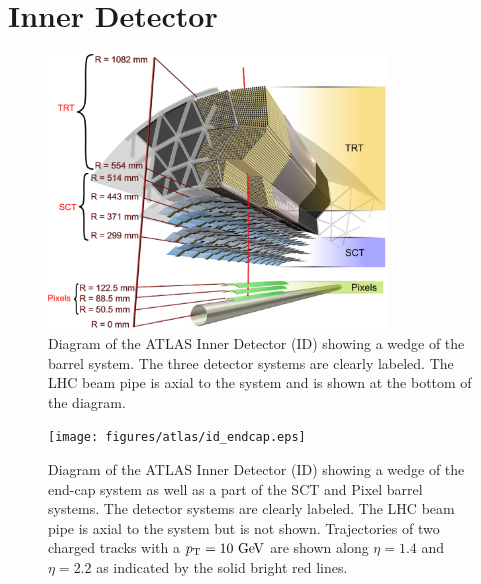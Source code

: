 \section{Inner Detector}
\label{sec:atlas_id}

\begin{figure}[htb]
\centering
\includegraphics[width=0.8\textwidth]{figures/atlas/id_barrel.eps}
\caption{Diagram of the ATLAS Inner Detector (ID) showing 
a wedge of the barrel system.  The three detector systems
are clearly labeled. The LHC beam pipe is axial to the system
and is shown at the bottom of the diagram.}
\label{fig:atlas_id_barrel}
\end{figure}

\begin{figure}[htb]
\centering
\texttt{[image: figures/atlas/id\_endcap.eps]}
\caption{Diagram of the ATLAS Inner Detector (ID) showing 
a wedge of the end-cap system as well as a part of the SCT and Pixel
barrel systems.  The detector systems
are clearly labeled.  The LHC beam pipe is axial to the system
but is not shown. Trajectories of two charged tracks 
with a $\pt=10\GeV$ are shown along $\eta=1.4$ and $\eta=2.2$ as
indicated by the solid bright red lines.}
\label{fig:atlas_id_endcap}
\end{figure}


